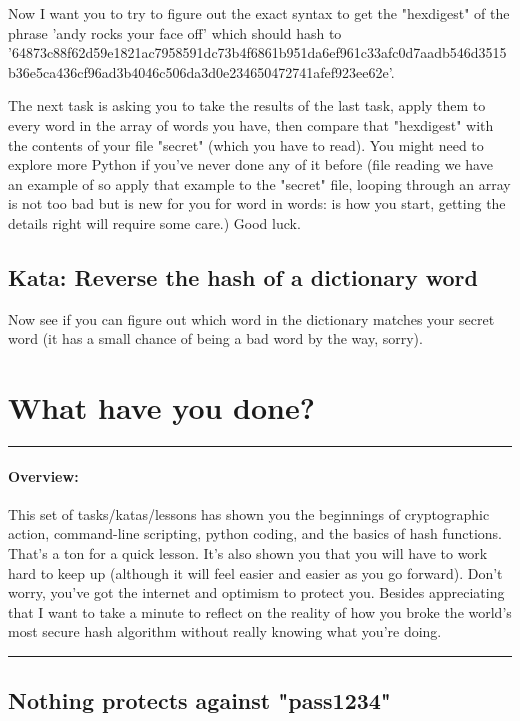 \documentclass[12pt]{book}
\newenvironment{task}[1][Task:]{ %
    \medskip
    \begin{mdframed}[style=info]
        \noindent{\textbf{#1}}
}{
    \end{mdframed}
}
\newenvironment{overview}
  {\noindent\rule{\textwidth}{0.4pt}
  \paragraph{Overview:}
  }
  {\par
  \noindent\rule{\textwidth}{0.4pt}
  }
\begin{document}
\begin{task}[Progress on your own:]
Now I want you to try to figure out the exact syntax to get the "hexdigest" of the phrase 'andy rocks your face off' which should hash to '64873c88f62d59e1821ac7958591dc73b4f6861b951da6ef961c33afc0d7aadb546d3515b36e5ca436cf96ad3b4046c506da3d0e234650472741afef923ee62e'.
\end{task}

The next task is asking you to take the results of the last task, apply them to every word in the array of words you have, then compare that "hexdigest" with the contents of your file "secret" (which you have to read). You might need to explore more Python if you've never done any of it before (file reading we have an example of so apply that example to the "secret" file, looping through an array is not too bad but is new for you for word in words: is how you start, getting the details right will require some care.) Good luck.

\subsection{Kata: Reverse the hash of a dictionary word}

\begin{task}
  Now see if you can figure out which word in the dictionary matches your secret word (it has a small chance of being a bad word by the way, sorry).
\end{task}

\section{What have you done?}

\begin{overview}
  This set of tasks/katas/lessons has shown you the beginnings of cryptographic action, command-line scripting, python coding, and the basics of hash functions. That's a ton for a quick lesson. It's also shown you that you will have to work hard to keep up (although it will feel easier and easier as you go forward). Don't worry, you've got the internet and optimism to protect you. Besides appreciating that I want to take a minute to reflect on the reality of how you broke the world's most secure hash algorithm without really knowing what you're doing.
\end{overview}

\subsection{Nothing protects against "pass1234"}
\end{document}

